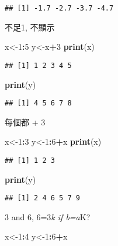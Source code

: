 \documentclass[]{article}
\newenvironment{Shaded}{\begin{snugshade}}{\end{snugshade}}
\newcommand{\DecValTok}[1]{\textcolor[rgb]{0.00,0.00,0.81}{#1}}
\newcommand{\KeywordTok}[1]{\textcolor[rgb]{0.13,0.29,0.53}{\textbf{#1}}}
\newcommand{\NormalTok}[1]{#1}
\newcommand{\OperatorTok}[1]{\textcolor[rgb]{0.81,0.36,0.00}{\textbf{#1}}}
\begin{document}
\begin{verbatim}
## [1] -1.7 -2.7 -3.7 -4.7
\end{verbatim}

不足1, 不顯示

\begin{Shaded}
\begin{Highlighting}[]
\NormalTok{x<-}\DecValTok{1}\OperatorTok{:}\DecValTok{5}
\NormalTok{y<-x}\OperatorTok{+}\DecValTok{3}
\KeywordTok{print}\NormalTok{(x)}
\end{Highlighting}
\end{Shaded}

\begin{verbatim}
## [1] 1 2 3 4 5
\end{verbatim}

\begin{Shaded}
\begin{Highlighting}[]
\KeywordTok{print}\NormalTok{(y)}
\end{Highlighting}
\end{Shaded}

\begin{verbatim}
## [1] 4 5 6 7 8
\end{verbatim}

每個都 + 3

\begin{Shaded}
\begin{Highlighting}[]
\NormalTok{x<-}\DecValTok{1}\OperatorTok{:}\DecValTok{3}
\NormalTok{y<-}\DecValTok{1}\OperatorTok{:}\DecValTok{6}\OperatorTok{+}\NormalTok{x}
\KeywordTok{print}\NormalTok{(x)}
\end{Highlighting}
\end{Shaded}

\begin{verbatim}
## [1] 1 2 3
\end{verbatim}

\begin{Shaded}
\begin{Highlighting}[]
\KeywordTok{print}\NormalTok{(y)}
\end{Highlighting}
\end{Shaded}

\begin{verbatim}
## [1] 2 4 6 5 7 9
\end{verbatim}

3 and 6, 6=3\emph{k if b=a}K?

\begin{Shaded}
\begin{Highlighting}[]
\NormalTok{x<-}\DecValTok{1}\OperatorTok{:}\DecValTok{4}
\NormalTok{y<-}\DecValTok{1}\OperatorTok{:}\DecValTok{6}\OperatorTok{+}\NormalTok{x}
\end{Highlighting}
\end{Shaded}
\end{document}

